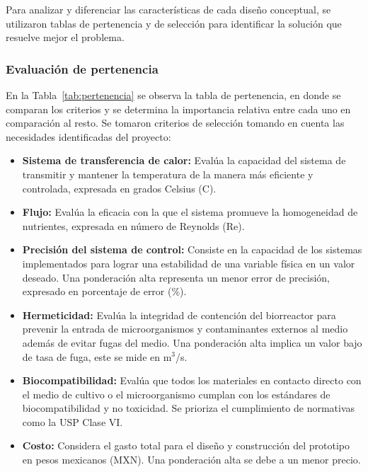 \documentclass[11pt,tesis,twoside,openright,spanish]{upiiztt}
\begin{document}
Para analizar y diferenciar las características de cada diseño conceptual, se
utilizaron tablas de pertenencia y de selección para identificar la solución que
resuelve mejor el problema.

\subsubsection{Evaluación de pertenencia}

En la Tabla~\ref{tab:pertenencia} se observa la tabla de pertenencia, en donde se comparan los criterios
y se determina la importancia relativa entre cada uno en comparación al resto. Se
tomaron criterios de selección tomando en cuenta las necesidades identificadas del
proyecto:

\begin{itemize}
  \item \textbf{Sistema de transferencia de calor:} Evalúa la capacidad del sistema de transmitir y mantener la temperatura de la manera más eficiente y controlada, expresada en grados Celsius (\textdegree C).
  \item \textbf{Flujo:} Evalúa la eficacia con la que el sistema promueve la homogeneidad de nutrientes, expresada en número de Reynolds (Re).
  \item \textbf{Precisión del sistema de control:} Consiste en la capacidad de los sistemas implementados para lograr una estabilidad de una variable física en un valor deseado. Una ponderación alta representa un menor error de precisión, expresado en porcentaje de error (\%).
  \item \textbf{Hermeticidad:} Evalúa la integridad de contención del biorreactor para prevenir la entrada de microorganismos y contaminantes externos al medio además de evitar fugas del medio. Una ponderación alta implica un valor bajo de tasa de fuga, este se mide en m$^3$/s.
  \item \textbf{Biocompatibilidad:} Evalúa que todos los materiales en contacto directo con el medio de cultivo o el microorganismo cumplan con los estándares de biocompatibilidad y no toxicidad. Se prioriza el cumplimiento de normativas como la USP Clase VI.
  \item \textbf{Costo:} Considera el gasto total para el diseño y construcción del prototipo en pesos mexicanos (MXN). Una ponderación alta se debe a un menor precio.
\end{itemize}
\end{document}

